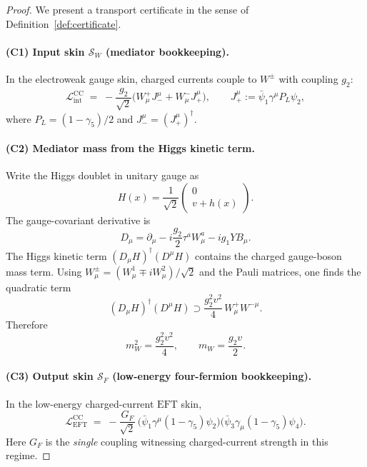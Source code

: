 \documentclass[11pt]{article}
\theoremstyle{remark}
\newcommand{\EFT}{\ensuremath{\mathrm{EFT}}}
\newcommand{\CC}{\ensuremath{\mathrm{CC}}}
\newcommand{\Skin}{\mathcal{S}}
\begin{document}
\begin{proof}
We present a transport certificate in the sense of Definition~\ref{def:certificate}.

\paragraph{(C1) Input skin $\Skin_W$ (mediator bookkeeping).}
In the electroweak gauge skin, charged currents couple to $W^\pm$ with coupling $g_2$:
\begin{equation}\label{eq:LintW}
\mathcal{L}_{\text{int}}^{\CC} \;=\; -\frac{g_2}{\sqrt{2}}\Big(W^+_\mu J_-^\mu + W^-_\mu J_+^\mu\Big),
\qquad
J_+^\mu := \bar\psi_1\gamma^\mu P_L \psi_2,
\end{equation}
where $P_L=(1-\gamma_5)/2$ and $J_-^\mu=(J_+^\mu)^\dagger$.

\paragraph{(C2) Mediator mass from the Higgs kinetic term.}
Write the Higgs doublet in unitary gauge as
\begin{equation}
H(x)=\frac{1}{\sqrt{2}}
\begin{pmatrix}
0\\ v+h(x)
\end{pmatrix}.
\end{equation}
The gauge-covariant derivative is
\begin{equation}
D_\mu = \partial_\mu - i\frac{g_2}{2}\tau^a W^a_\mu - i g_1 Y B_\mu.
\end{equation}
The Higgs kinetic term $(D_\mu H)^\dagger(D^\mu H)$ contains the charged gauge-boson mass term.
Using $W^\pm_\mu=(W^1_\mu\mp i W^2_\mu)/\sqrt2$ and the Pauli matrices,
one finds the quadratic term
\begin{equation}\label{eq:mWterm}
(D_\mu H)^\dagger(D^\mu H)\supset \frac{g_2^2 v^2}{4}\,W^+_\mu W^{-\mu}.
\end{equation}
Therefore
\begin{equation}\label{eq:mW}
m_W^2=\frac{g_2^2 v^2}{4}, \qquad m_W=\frac{g_2 v}{2}.
\end{equation}

\paragraph{(C3) Output skin $\Skin_F$ (low-energy four-fermion bookkeeping).}
In the low-energy charged-current $\EFT$ skin,
\begin{equation}\label{eq:GFdef}
\mathcal{L}_{\EFT}^{\CC} \;=\; -\frac{G_F}{\sqrt2}\,
\big(\bar\psi_1\gamma^\mu (1-\gamma_5)\psi_2\big)
\big(\bar\psi_3\gamma_\mu (1-\gamma_5)\psi_4\big).
\end{equation}
Here $G_F$ is the \emph{single} coupling witnessing charged-current strength in this regime.


\end{proof}
\end{document}
